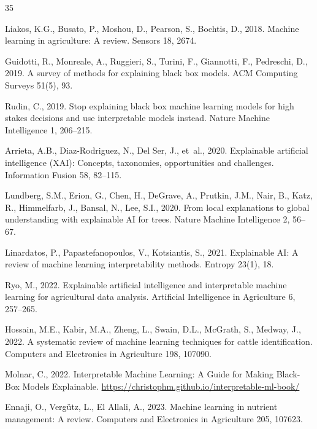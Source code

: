 \documentclass[3p,twocolumn,authoryear]{elsarticle}
\begin{document}
\begin{thebibliography}{35}
{
Liakos, K.G., Busato, P., Moshou, D., Pearson, S., Bochtis, D., 2018.
Machine learning in agriculture: A review.
Sensors 18, 2674.

Guidotti, R., Monreale, A., Ruggieri, S., Turini, F., Giannotti, F.,
  Pedreschi, D., 2019.
A survey of methods for explaining black box models.
ACM Computing Surveys 51(5), 93.

Rudin, C., 2019.
Stop explaining black box machine learning models for high stakes
decisions and use interpretable models instead.
Nature Machine Intelligence 1, 206--215.

Arrieta, A.B., Diaz-Rodriguez, N., Del Ser, J., et~al., 2020.
Explainable artificial intelligence (XAI): Concepts, taxonomies,
opportunities and challenges.
Information Fusion 58, 82--115.

Lundberg, S.M., Erion, G., Chen, H., DeGrave, A., Prutkin, J.M.,
  Nair, B., Katz, R., Himmelfarb, J., Bansal, N., Lee, S.I., 2020.
From local explanations to global understanding with explainable AI
for trees.
Nature Machine Intelligence 2, 56--67.

Linardatos, P., Papastefanopoulos, V., Kotsiantis, S., 2021.
Explainable AI: A review of machine learning interpretability methods.
Entropy 23(1), 18.

Ryo, M., 2022.
Explainable artificial intelligence and interpretable machine learning
for agricultural data analysis.
Artificial Intelligence in Agriculture 6, 257--265.

Hossain, M.E., Kabir, M.A., Zheng, L., Swain, D.L., McGrath, S.,
  Medway, J., 2022.
A systematic review of machine learning techniques for cattle
identification.
Computers and Electronics in Agriculture 198, 107090.

Molnar, C., 2022.
Interpretable Machine Learning: A Guide for Making Black-Box Models
Explainable.
\url{https://christophm.github.io/interpretable-ml-book/}

Ennaji, O., Vergütz, L., El Allali, A., 2023.
Machine learning in nutrient management: A review.
Computers and Electronics in Agriculture 205, 107623.

}
\end{thebibliography}
\end{document}
